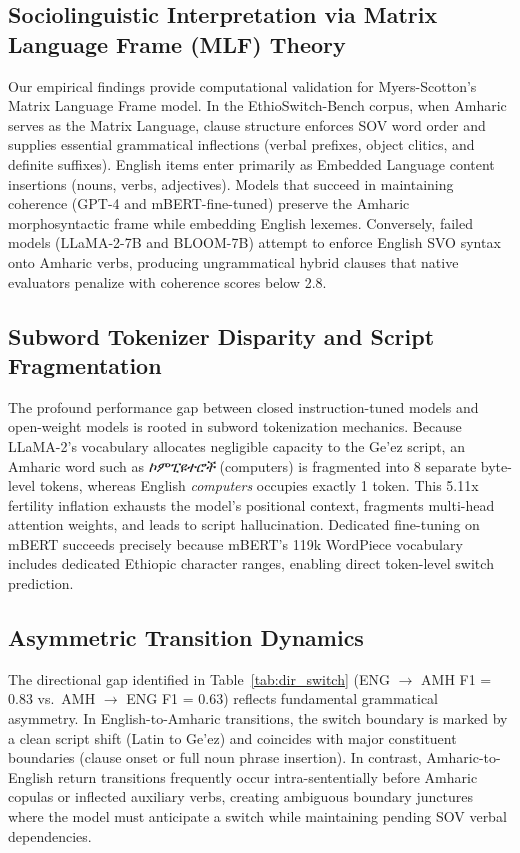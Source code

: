 \documentclass[11pt,a4paper]{article}
\begin{document}
\subsection{Sociolinguistic Interpretation via Matrix Language Frame (MLF) Theory}
Our empirical findings provide computational validation for Myers-Scotton's \cite{myersscotton1993duelling} Matrix Language Frame model. In the EthioSwitch-Bench corpus, when Amharic serves as the Matrix Language, clause structure enforces SOV word order and supplies essential grammatical inflections (verbal prefixes, object clitics, and definite suffixes). English items enter primarily as Embedded Language content insertions (nouns, verbs, adjectives). Models that succeed in maintaining coherence (GPT-4 and mBERT-fine-tuned) preserve the Amharic morphosyntactic frame while embedding English lexemes. Conversely, failed models (LLaMA-2-7B and BLOOM-7B) attempt to enforce English SVO syntax onto Amharic verbs, producing ungrammatical hybrid clauses that native evaluators penalize with coherence scores below 2.8.

\subsection{Subword Tokenizer Disparity and Script Fragmentation}
The profound performance gap between closed instruction-tuned models and open-weight models is rooted in subword tokenization mechanics. Because LLaMA-2's vocabulary allocates negligible capacity to the Ge'ez script, an Amharic word such as \textit{ኮምፒዩተሮች} (computers) is fragmented into 8 separate byte-level tokens, whereas English \textit{computers} occupies exactly 1 token. This 5.11x fertility inflation exhausts the model's positional context, fragments multi-head attention weights, and leads to script hallucination. Dedicated fine-tuning on mBERT succeeds precisely because mBERT's 119k WordPiece vocabulary includes dedicated Ethiopic character ranges, enabling direct token-level switch prediction.

\subsection{Asymmetric Transition Dynamics}
The directional gap identified in Table~\ref{tab:dir_switch} (ENG $\rightarrow$ AMH F1 = 0.83 vs.\ AMH $\rightarrow$ ENG F1 = 0.63) reflects fundamental grammatical asymmetry. In English-to-Amharic transitions, the switch boundary is marked by a clean script shift (Latin to Ge'ez) and coincides with major constituent boundaries (clause onset or full noun phrase insertion). In contrast, Amharic-to-English return transitions frequently occur intra-sententially before Amharic copulas or inflected auxiliary verbs, creating ambiguous boundary junctures where the model must anticipate a switch while maintaining pending SOV verbal dependencies.
\end{document}
